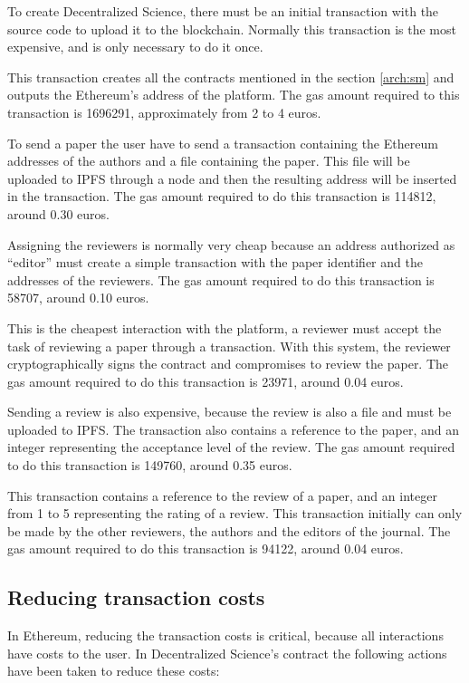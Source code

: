 \begin{itemize}
   To create Decentralized Science, there must be an
  initial transaction with the source code to upload it to the blockchain.
  Normally this transaction is the most expensive, and is only necessary to do
  it once.

  This transaction creates all the contracts mentioned in the section
  \ref{arch:sm} and outputs the Ethereum's address of the platform. The gas
  amount required to this transaction is 1696291, approximately from 2 to 4
  euros.

   To send a paper the user have to send a transaction
  containing the Ethereum addresses of the authors and a file containing the
  paper. This file will be uploaded to IPFS through a node and then the
  resulting address will be inserted in the transaction. The gas amount required
  to do this transaction is 114812, around 0.30 euros.

   Assigning the reviewers is normally very cheap
  because an address authorized as ``editor'' must create a simple transaction
  with the paper identifier and the addresses of the reviewers. The gas amount
  required to do this transaction is 58707, around 0.10 euros.

   This is the cheapest interaction with the platform, a
  reviewer must accept the task of reviewing a paper through a transaction. With
  this system, the reviewer cryptographically signs the contract and compromises
  to review the paper. The gas amount required to do this transaction is 23971,
  around 0.04 euros.

   Sending a review is also expensive, because the review is
  also a file and must be uploaded to IPFS. The transaction also contains a
  reference to the paper, and an integer representing the acceptance level of
  the review. The gas amount required to do this transaction is 149760, around
  0.35 euros.

   This transaction contains a reference to the review of a
  paper, and an integer from 1 to 5 representing the rating of a review. This
  transaction initially can only be made by the other reviewers, the authors and
  the editors of the journal. The gas amount required to do this transaction is
  94122, around 0.04 euros.

\end{itemize}

\subsection{Reducing transaction costs}
In Ethereum, reducing the transaction costs is critical, because all
interactions have costs to the user. In Decentralized Science's contract the
following actions have been taken to reduce these costs:

